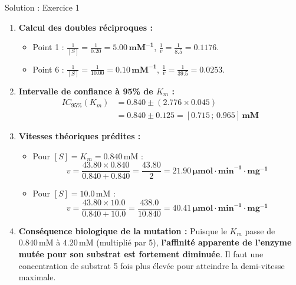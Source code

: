 \documentclass[11pt,a4paper]{article}
\begin{document}
\begin{solutionbox}{Solution : Exercice 1}
\begin{enumerate}[label=\textbf{\alph*.}]
  \item \textbf{Calcul des doubles réciproques :}
  \begin{itemize}
    \item Point 1 : $\frac{1}{[S]} = \frac{1}{0.20} = \mathbf{5.00\,\text{mM}^{-1}}$, \quad $\frac{1}{v} = \frac{1}{8.5} = \mathbf{0.1176}$.
    \item Point 6 : $\frac{1}{[S]} = \frac{1}{10.00} = \mathbf{0.10\,\text{mM}^{-1}}$, \quad $\frac{1}{v} = \frac{1}{39.5} = \mathbf{0.0253}$.
  \end{itemize}
  \item \textbf{Intervalle de confiance à 95\% de $K_m$ :}
  \begin{align*}
    IC_{95\%}(K_m) &= 0.840 \pm \left( 2.776 \times 0.045 \right) \\
    &= 0.840 \pm 0.125 = \mathbf{[0.715 \,;\, 0.965]\,\text{mM}}
  \end{align*}
  \item \textbf{Vitesses théoriques prédites :}
  \begin{itemize}
    \item Pour $[S] = K_m = 0.840\,\text{mM}$ :
    \begin{equation*}
      v = \frac{43.80 \times 0.840}{0.840 + 0.840} = \frac{43.80}{2} = \mathbf{21.90\,\mu\text{mol}\cdot\text{min}^{-1}\cdot\text{mg}^{-1}}
    \end{equation*}
    \item Pour $[S] = 10.0\,\text{mM}$ :
    \begin{equation*}
      v = \frac{43.80 \times 10.0}{0.840 + 10.0} = \frac{438.0}{10.840} = \mathbf{40.41\,\mu\text{mol}\cdot\text{min}^{-1}\cdot\text{mg}^{-1}}
    \end{equation*}
  \end{itemize}
  \item \textbf{Conséquence biologique de la mutation :}
  Puisque le $K_m$ passe de $0.840\,\text{mM}$ à $4.20\,\text{mM}$ (multiplié par 5), \textbf{l'affinité apparente de l'enzyme mutée pour son substrat est fortement diminuée}. Il faut une concentration de substrat 5 fois plus élevée pour atteindre la demi-vitesse maximale.
\end{enumerate}
\end{solutionbox}
\end{document}
